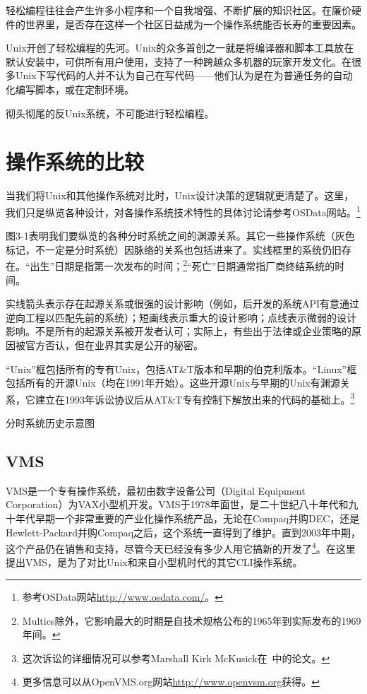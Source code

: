 \documentclass[12pt,oneside]{ctexbook}
\begin{document}
\begin{common-format}
轻松编程往往会产生许多小程序和一个自我增强、不断扩展的知识社区。在廉价硬件的世界里，是否存在这样一个社区日益成为一个操作系统能否长寿的重要因素。

Unix开创了轻松编程的先河。Unix的众多首创之一就是将编译器和脚本工具放在默认安装中，可供所有用户使用，支持了一种跨越众多机器的玩家开发文化。在很多Unix下写代码的人并不认为自己在写代码——他们认为是在为普通任务的自动化编写脚本，或在定制环境。

彻头彻尾的反Unix系统，不可能进行轻松编程。

\section{操作系统的比较}
当我们将Unix和其他操作系统对比时，Unix设计决策的逻辑就更清楚了。这里，我们只是纵览各种设计，对各操作系统技术特性的具体讨论请参考OSData网站。\footnote{参考OSData网站\href{http://www.osdata.com/}{http://www.osdata.com/}。}

图3-1表明我们要纵览的各种分时系统之间的渊源关系。其它一些操作系统（灰色标记，不一定是分时系统）因脉络的关系也包括进来了。实线框里的系统仍旧存在。“出生”日期是指第一次发布的时间；\footnote{Multics除外，它影响最大的时期是自技术规格公布的1965年到实际发布的1969年间。}“死亡”日期通常指厂商终结系统的时间。

实线箭头表示存在起源关系或很强的设计影响（例如，后开发的系统API有意通过逆向工程以匹配先前的系统）；短画线表示重大的设计影响；点线表示微弱的设计影响。不是所有的起源关系被开发者认可；实际上，有些出于法律或企业策略的原因被官方否认，但在业界其实是公开的秘密。

“Unix”框包括所有的专有Unix，包括AT\&{}T版本和早期的伯克利版本。“Linux”框包括所有的开源Unix（均在1991年开始）。这些开源Unix与早期的Unix有渊源关系，它建立在1993年诉讼协议后从AT\&{}T专有控制下解放出来的代码的基础上。\footnote{这次诉讼的详细情况可以参考Marshall Kirk McKusick在~\cite{OpenSources}中的论文。}

\begin{linefig}{分时系统历史示意图}
\label{fig:分时系统历史示意图}
\end{linefig}

\subsection{VMS}
VMS是一个专有操作系统，最初由数字设备公司（Digital Equipment Corporation）为VAX小型机开发。VMS于1978年面世，是二十世纪八十年代和九十年代早期一个非常重要的产业化操作系统产品，无论在Compaq并购DEC，还是Hewlett-Packard并购Compaq之后，这个系统一直得到了维护。直到2003年中期，这个产品仍在销售和支持，尽管今天已经没有多少人用它搞新的开发了\footnote{更多信息可以从OpenVMS.org网站\href{http://www.openvsm.org}{http://www.openvsm.org}获得。}。在这里提出VMS，是为了对比Unix和来自小型机时代的其它CLI操作系统。


\end{common-format}
\end{document}
